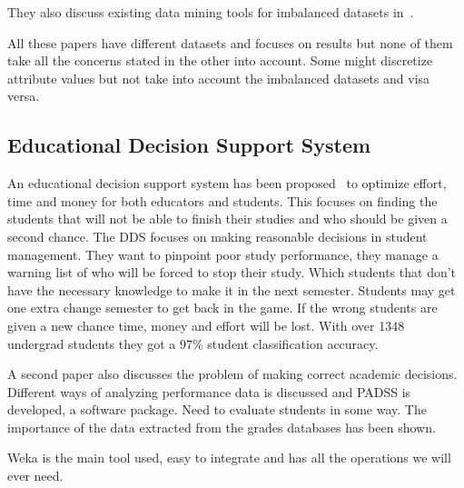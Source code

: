 \bigskip\noindent
They also discuss existing data mining tools for imbalanced datasets in~\cite{8}.


\bigskip\noindent
All these papers have different datasets and focuses on results but none of them take all the concerns stated in the other into account. 
Some might discretize attribute values but not take into account the imbalanced datasets and visa versa.

\subsection{Educational Decision Support System}
An educational decision support system has been proposed~\cite{5} to optimize effort, time and money for both educators and students. 
This focuses on finding the students that will not be able to finish their studies and who should be given a second chance. 
The DDS focuses on making reasonable decisions in student management. 
They want to pinpoint poor study performance, they manage a warning list of who will be forced to stop their study. 
Which students that don't have the necessary knowledge to make it in the next semester. 
Students may get one extra change semester to get back in the game. 
If the wrong students are given a new chance time, money and effort will be lost. 
With over 1348 undergrad students they got a 97\% student classification accuracy.

\bigskip\noindent
A second paper also discusses the problem of making correct academic decisions.~\cite{6} 
Different ways of analyzing performance data is discussed and PADSS is developed, a software package. 
Need to evaluate students in some way. The importance of the data extracted from the grades databases has been shown. 

\bigskip\noindent
Weka is the main tool used, easy to integrate and has all the operations we will ever need.


